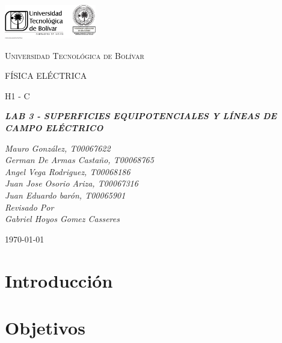 \documentclass[letterpaper, 12pt]{report}
\begin{document}
\begin{titlepage}
	\centering
	\includegraphics[width=0.3\textwidth]{Images/logo_utb.png}\par\vspace{1cm}
	{\scshape\LARGE Universidad Tecnológica de Bolívar \par}
	\vspace{1cm}

	{\scshape\Large FÍSICA ELÉCTRICA \par}
	\vspace{.2cm}

	{\scshape\Large H1 - C \par}
	\vspace{1cm}
	\slshape {\Large \bfseries{} LAB 3 - SUPERFICIES EQUIPOTENCIALES Y LÍNEAS
		DE CAMPO ELÉCTRICO  \\}
	\vspace{1cm}

	\slshape {\itshape{} Mauro González, T00067622 \\}
	\slshape {\itshape{} German De Armas Castaño, T00068765 \\}
	\slshape {\itshape{} Angel Vega Rodriguez, T00068186 \\}
	\slshape {\itshape{} Juan Jose Osorio Ariza, T00067316 \\}
	\slshape {\itshape{} Juan Eduardo barón, T00065901 \\}
	\vfill
	Revisado Por \\
	Gabriel Hoyos Gomez Casseres\\
	{\large \today\par}
\end{titlepage}

\section{Introducción}



\newpage

\section{Objetivos}
\end{document}

